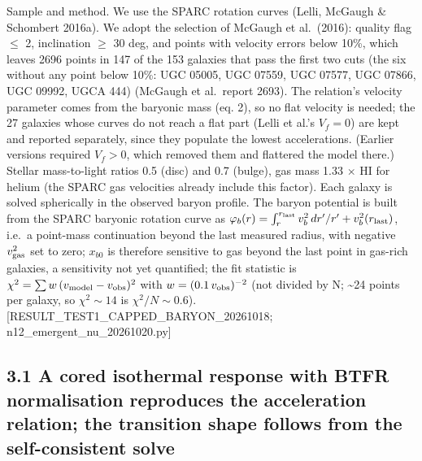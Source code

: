 \documentclass[
  10pt,
]{article}
\begin{document}
Sample and method. We use the SPARC rotation curves (Lelli, McGaugh \& Schombert 2016a). We adopt the selection of McGaugh et al.~(2016): quality flag $\le$ 2, inclination $\ge$ 30 deg, and points with velocity errors below 10\%, which leaves 2696 points in 147 of the 153 galaxies that pass the first two cuts (the six without any point below 10\%: UGC 05005, UGC 07559, UGC 07577, UGC 07866, UGC 09992, UGCA 444) (McGaugh et al.\ report 2693). The relation's velocity parameter comes from the baryonic mass (eq. 2), so no flat velocity is needed; the 27 galaxies whose curves do not reach a flat part (Lelli et al.'s $V_f=0$) are kept and reported separately, since they populate the lowest accelerations. (Earlier versions required $V_f>0$, which removed them and flattered the model there.) Stellar mass-to-light ratios 0.5 (disc) and
0.7 (bulge), gas mass 1.33 $\times$ HI for helium (the SPARC gas velocities already include this factor). Each galaxy is solved spherically in the observed baryon profile. The baryon potential is built from the SPARC baryonic rotation curve as $\varphi_b(r)=\int_r^{r_{\rm last}}v_b^2\,dr'/r'+v_b^2(r_{\rm last})$, i.e.\ a point-mass continuation beyond the last measured radius, with negative $v_{\rm gas}^2$ set to zero; $x_{b0}$ is therefore sensitive to gas beyond the last point in gas-rich galaxies, a sensitivity not yet quantified; the fit statistic is $\chi^2=\sum w\,(v_{\rm model}-v_{\rm obs})^2$ with $w=(0.1\,v_{\rm obs})^{-2}$ (not divided by N;
\textasciitilde{}24 points per galaxy, so $\chi^2\sim 14$ is $\chi^2/N\sim 0.6$).
{[}RESULT\_TEST1\_CAPPED\_BARYON\_20261018;
n12\_emergent\_nu\_20261020.py{]}

\subsection{3.1 A cored isothermal response with BTFR normalisation reproduces the acceleration relation; the transition shape follows from the self-consistent solve}\label{a-cored-isothermal-response-with-btfr-normalisation-reproduces-the-acceleration-relation-the-transition-shape-is-the-output}
\end{document}
